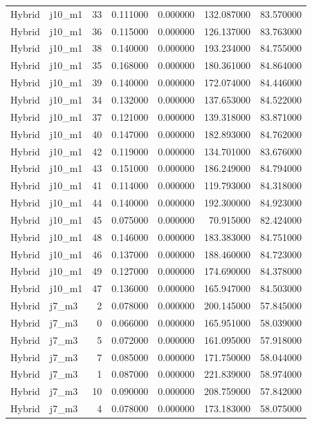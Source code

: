 \begin{tabular}{llrrrrr}
Hybrid & j10_m1 & 33 & 0.111000 & 0.000000 & 132.087000 & 83.570000 \\
Hybrid & j10_m1 & 36 & 0.115000 & 0.000000 & 126.137000 & 83.763000 \\
Hybrid & j10_m1 & 38 & 0.140000 & 0.000000 & 193.234000 & 84.755000 \\
Hybrid & j10_m1 & 35 & 0.168000 & 0.000000 & 180.361000 & 84.864000 \\
Hybrid & j10_m1 & 39 & 0.140000 & 0.000000 & 172.074000 & 84.446000 \\
Hybrid & j10_m1 & 34 & 0.132000 & 0.000000 & 137.653000 & 84.522000 \\
Hybrid & j10_m1 & 37 & 0.121000 & 0.000000 & 139.318000 & 83.871000 \\
Hybrid & j10_m1 & 40 & 0.147000 & 0.000000 & 182.893000 & 84.762000 \\
Hybrid & j10_m1 & 42 & 0.119000 & 0.000000 & 134.701000 & 83.676000 \\
Hybrid & j10_m1 & 43 & 0.151000 & 0.000000 & 186.249000 & 84.794000 \\
Hybrid & j10_m1 & 41 & 0.114000 & 0.000000 & 119.793000 & 84.318000 \\
Hybrid & j10_m1 & 44 & 0.140000 & 0.000000 & 192.300000 & 84.923000 \\
Hybrid & j10_m1 & 45 & 0.075000 & 0.000000 & 70.915000 & 82.424000 \\
Hybrid & j10_m1 & 48 & 0.146000 & 0.000000 & 183.383000 & 84.751000 \\
Hybrid & j10_m1 & 46 & 0.137000 & 0.000000 & 188.460000 & 84.723000 \\
Hybrid & j10_m1 & 49 & 0.127000 & 0.000000 & 174.690000 & 84.378000 \\
Hybrid & j10_m1 & 47 & 0.136000 & 0.000000 & 165.947000 & 84.503000 \\
Hybrid & j7_m3 & 2 & 0.078000 & 0.000000 & 200.145000 & 57.845000 \\
Hybrid & j7_m3 & 0 & 0.066000 & 0.000000 & 165.951000 & 58.039000 \\
Hybrid & j7_m3 & 5 & 0.072000 & 0.000000 & 161.095000 & 57.918000 \\
Hybrid & j7_m3 & 7 & 0.085000 & 0.000000 & 171.750000 & 58.044000 \\
Hybrid & j7_m3 & 1 & 0.087000 & 0.000000 & 221.839000 & 58.974000 \\
Hybrid & j7_m3 & 10 & 0.090000 & 0.000000 & 208.759000 & 57.842000 \\
Hybrid & j7_m3 & 4 & 0.078000 & 0.000000 & 173.183000 & 58.075000 \\

\end{tabular}

